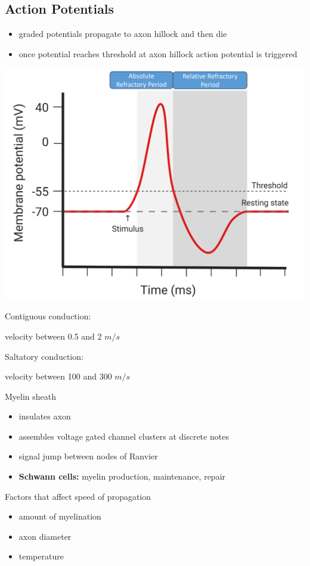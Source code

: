 \documentclass[11pt,fleqn]{book}
\begin{document}
\subsection{Action Potentials}
\begin{itemize}
    \item graded potentials propagate to axon hillock and then die
    \item once potential reaches threshold at axon hillock action potential is triggered
\end{itemize}
\begin{center}
    \includegraphics[width=0.65\linewidth]{Pictures/Screenshot 2024-02-26 003521.png}
\end{center}
\begin{descriptions}
    \item[Contiguous conduction:] 
    \begin{descriptions}
    \end{descriptions}    
    velocity between 0.5 and 2 $m/s$
    \item[Saltatory conduction:] 
    \begin{descriptions}
    \end{descriptions}    
    velocity between 100 and 300 $m/s$ 
    \item[Myelin sheath]\begin{descriptions}
    \end{descriptions} 
    \begin{itemize}
        \item insulates axon
        \item assembles voltage gated channel clusters at discrete notes
        \item signal jump between nodes of Ranvier
        \item \textbf{Schwann cells:} myelin production, maintenance, repair
    \end{itemize}
    \item[Factors that affect speed of propagation]\begin{descriptions}
    \end{descriptions} 
    \begin{itemize}
        \item amount of myelination
        \item axon diameter
        \item temperature
    \end{itemize}
\end{descriptions}
\end{document}
